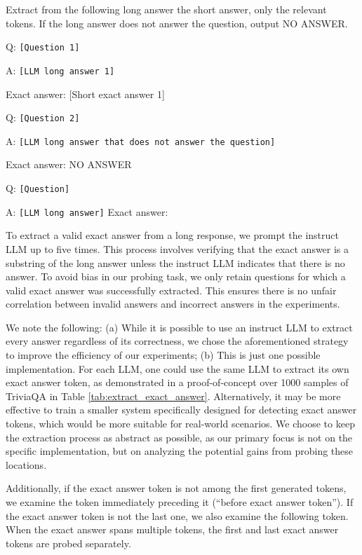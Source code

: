 \documentclass{article} %
\begin{document}
\begin{mdframed}[backgroundcolor=blue!5, skipabove=0.5\baselineskip]
\small
        Extract from the following long answer the short answer, only the relevant tokens. If the long answer does not answer the question, output NO ANSWER.

        Q: \texttt{[Question 1]}
        
        A: \texttt{[LLM long answer 1]}
        
        Exact answer: [Short exact answer 1]

        Q: \texttt{[Question 2]}
        
        A: \texttt{[LLM long answer that does not answer the question]}
        
        Exact answer: NO ANSWER

        Q: \texttt{[Question]}
        
        A: \texttt{[LLM long answer]}
        Exact answer:

\end{mdframed}

To extract a valid exact answer from a long response, we prompt the instruct LLM up to five times.
This process involves verifying that the exact answer is a substring of the long answer unless the instruct LLM indicates that there is no answer.
To avoid bias in our probing task, we only retain questions for which a valid exact answer was successfully extracted.
This ensures there is no unfair correlation between invalid answers and incorrect answers in the experiments.

We note the following:
(a) While it is possible to use an instruct LLM to extract every answer regardless of its correctness, we chose the aforementioned strategy to improve the efficiency of our experiments;
(b) This is just one possible implementation. For each LLM, one could use the same LLM to extract its own exact answer token, as demonstrated in a proof-of-concept over 1000 samples of TriviaQA in Table \ref{tab:extract_exact_answer}.
Alternatively, it may be more effective to train a smaller system specifically designed for detecting exact answer tokens, which would be more suitable for real-world scenarios.
We choose to keep the extraction process as abstract as possible, as our primary focus is not on the specific implementation, but on analyzing the potential gains from probing these locations.

Additionally, if the exact answer token is not among the first generated tokens, we examine the token immediately preceding it (``before exact answer token'').
If the exact answer token is not the last one, we also examine the following token.
When the exact answer spans multiple tokens, the first and last exact answer tokens are probed separately.
\end{document}
